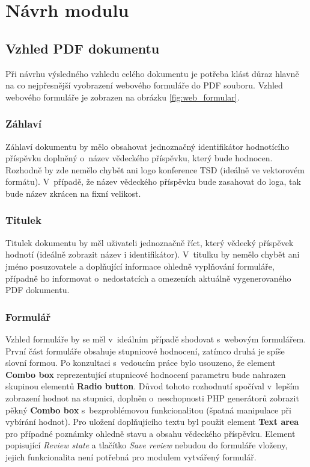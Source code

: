 \chapter{Návrh modulu}

\section{Vzhled PDF dokumentu}
\label{sec:navrh_vzhledu}
Při návrhu výsledného vzhledu celého dokumentu je potřeba klást důraz hlavně na co nejpřesnější vyobrazení webového formuláře do PDF souboru. Vzhled webového formuláře je zobrazen na obrázku \ref{fig:web_formular}.

\subsection{Záhlaví}
Záhlaví dokumentu by mělo obsahovat jednoznačný identifikátor hodnotícího příspěvku doplněný o~název vědeckého příspěvku, který bude hodnocen. Rozhodně by zde nemělo chybět ani logo konference TSD (ideálně ve vektorovém formátu). V~případě, že název vědeckého příspěvku bude zasahovat do loga, tak bude název zkrácen na fixní velikost.

\subsection{Titulek}
Titulek dokumentu by měl uživateli jednoznačně říct, který vědecký příspěvek hodnotí (ideálně zobrazit název i identifikátor). V~titulku by nemělo chybět ani jméno posuzovatele a doplňující informace ohledně vyplňování formuláře, případně ho informovat o~nedostatcích a omezeních aktuálně vygenerovaného PDF dokumentu.

\subsection{Formulář}
Vzhled formuláře by se měl v~ideálním případě shodovat s~webovým formulářem. První část formuláře obsahuje stupnicové hodnocení, zatímco druhá je spíše slovní formou. Po konzultaci s~vedoucím práce bylo usouzeno, že element \textbf{Combo box} reprezentující stupnicové hodnocení parametru bude nahrazen skupinou elementů \textbf{Radio button}. Důvod tohoto rozhodnutí spočíval v~lepším zobrazení hodnot na stupnici, doplněn o~neschopnosti PHP generátorů zobrazit pěkný \textbf{Combo box} s~bezproblémovou funkcionalitou (špatná manipulace při vybírání hodnot). Pro uložení doplňujícího textu byl použit element \textbf{Text area} pro případné poznámky ohledně stavu a obsahu vědeckého příspěvku. Element popisující \textit{Review state} a tlačítko \textit{Save review} nebudou do formuláře vloženy, jejich funkcionalita není potřebná pro modulem vytvářený formulář.

